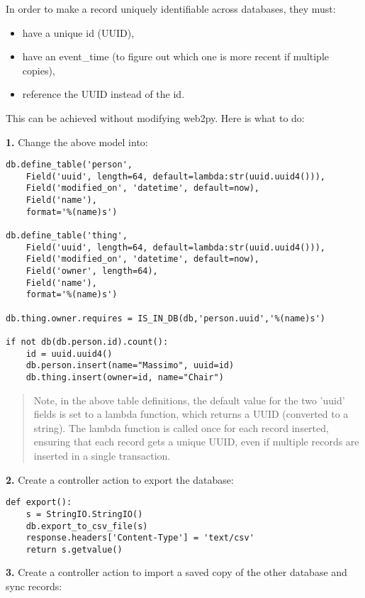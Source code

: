 \documentclass[justified,sixbynine,notoc]{tufte-book}
\begin{document}
\begin{fullwidth}
In order to make a record uniquely identifiable across databases, they
must:
\begin{itemize}
\item have a unique id (UUID),

\item have an event\_time (to figure out which one is more recent if multiple copies),

\item reference the UUID instead of the id.
\end{itemize}

This can be achieved without modifying web2py. Here is what to do:

{\bf 1.} Change the above model into:

\begin{lstlisting}
db.define_table('person',
    Field('uuid', length=64, default=lambda:str(uuid.uuid4())),
    Field('modified_on', 'datetime', default=now),
    Field('name'),
    format='%(name)s')

db.define_table('thing',
    Field('uuid', length=64, default=lambda:str(uuid.uuid4())),
    Field('modified_on', 'datetime', default=now),
    Field('owner', length=64),
    Field('name'),
    format='%(name)s')

db.thing.owner.requires = IS_IN_DB(db,'person.uuid','%(name)s')

if not db(db.person.id).count():
    id = uuid.uuid4()
    db.person.insert(name="Massimo", uuid=id)
    db.thing.insert(owner=id, name="Chair")
\end{lstlisting}

\begin{quote}Note, in the above table definitions, the default value for the two 'uuid' fields is set to a lambda function, which returns a UUID (converted to a string). The lambda function is called once for each record inserted, ensuring that each record gets a unique UUID, even if multiple records are inserted in a single transaction.\end{quote}
{\bf 2.} Create a controller action to export the database:

\begin{lstlisting}
def export():
    s = StringIO.StringIO()
    db.export_to_csv_file(s)
    response.headers['Content-Type'] = 'text/csv'
    return s.getvalue()
\end{lstlisting}

{\bf 3.} Create a controller action to import a saved copy of the other database and sync records:


\end{fullwidth}
\end{document}
